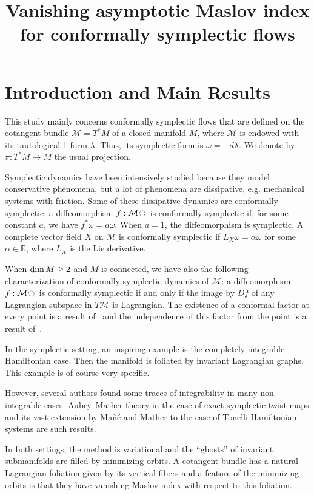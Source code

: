 \documentclass[AHL, Unicode, longabstracts, published]{cedram}
\title[Vanishing Maslov index]{Vanishing asymptotic Maslov index for conformally symplectic flows}
\author[\initial{M.-C.} \lastname{Arnaud}]{\firstname{Marie-Claude} \lastname{Arnaud}}
\author[\initial{A.} \lastname{Florio}]{\firstname{Anna} \lastname{Florio}}
\author[\initial{V.} \lastname{Roos}]{\firstname{Valentine} \lastname{Roos}}
\newcommand*\M{\mathcal{M}}
\newcommand*\cal{\mathcal}
\newcommand*\R{\mathbb{R}}
\renewcommand*\dim{{\rm dim}\,}
\begin{document}
\maketitle

\section{Introduction and Main Results}\label{SecIntro}

This study mainly concerns conformally symplectic flows that are defined on the cotangent bundle $\M=T^*M$ of a closed manifold $M$, where $\M$ is endowed with its tautological 1-form $\lambda$. Thus, its symplectic form is $\omega=-d\lambda$. We denote by $\pi:T^*M\rightarrow M$ the usual projection.

Symplectic dynamics have been intensively studied because they model conservative phenomena, but a lot of phenomena are dissipative, e.g. mechanical systems with friction. Some of these dissipative dynamics are conformally symplectic: a diffeomorphism $f : \M \,\rotatebox[origin=c]{90}{$\circlearrowleft$}\,$ is conformally symplectic if, for some constant $a$, we have $f^*\omega=a\omega$. When $a=1$, the diffeomorphism is symplectic. A complete vector field $X$ on $\cal M$ is conformally symplectic if $L_X\omega=\alpha\omega$ for some $\alpha\in\R$, where $L_X$ is the Lie derivative.

 When $\dim M\geq 2$ and $M$ is connected, we have also the following characterization of conformally symplectic dynamics of $\M$: a diffeomorphism $f : \M\,\rotatebox[origin=c]{90}{$\circlearrowleft$}\,$ is conformally symplectic if and only if the image by $Df$ of any Lagrangian subspace in $T\cal M$ is Lagrangian. The existence of a conformal factor at every point is a result of~\cite{LiveraniWojtkowski1998} and the independence of this factor from the point is a result of~\cite{Libermann1959}.



In the symplectic setting, an inspiring example is the completely integrable Hamiltonian case. Then the manifold is foliated by invariant Lagrangian graphs. This example is of course very specific.


However, several authors found some traces of integrability in many non integrable cases. Aubry--Mather theory in the case of exact symplectic twist maps and its vast extension by Mañé and Mather to the case of Tonelli Hamiltonian systems are such results.


In both settings, the method is variational and the ``ghosts'' of invariant submanifolds are filled by minimizing orbits. A cotangent bundle has a natural Lagrangian foliation given by its vertical fibers and a feature of the minimizing orbits is that they have vanishing Maslov index with respect to this foliation. 
\end{document}
